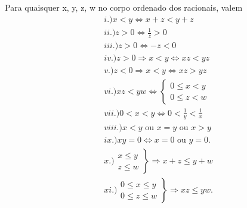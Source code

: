 \documentclass[Analysis/analysis_notes.tex]{subfiles}
\begin{document}
\begin{prop*}
	Para quaisquer x, y, z, w no corpo ordenado dos racionais, valem
	\begin{align*}
		 & i.) x < y\Longleftrightarrow x + z < y + z                       \\
		 & ii.) z > 0\Longleftrightarrow \frac{1}{z} > 0                    \\
		 & iii.) z > 0\Longleftrightarrow -z < 0                            \\
		 & iv.) z > 0\Rightarrow x < y\Longleftrightarrow xz < yz           \\
		 & v.) z < 0\Rightarrow x < y\Longleftrightarrow xz > yz            \\
		 & vi.) xz < yw\Longleftrightarrow \left\{\begin{array}{ll}
			                                          0 \leq{x} < y \\
			                                          0 \leq{z} < w
		                                          \end{array}\right.        \\
		 & vii.) 0 < x < y\Longleftrightarrow 0 < \frac{1}{y} < \frac{1}{x} \\
		 & viii.) x < y \text{ ou } x =y \text{ ou } x > y                  \\
		 & ix.) xy = 0\Longleftrightarrow x = 0\text{ ou }y = 0.            \\
		 & x.) \left.\begin{array}{ll}
			             x \leq{y} \\
			             z \leq{w}
		             \end{array}\right\}\Rightarrow x + z \leq{y + w}       \\
		 & xi.) \left.\begin{array}{ll}
			              0 \leq{x} \leq{y} \\
			              0 \leq{z} \leq{w}
		              \end{array}\right\}\Rightarrow xz \leq{yw}.
	\end{align*}
\end{prop*}
\end{document}
